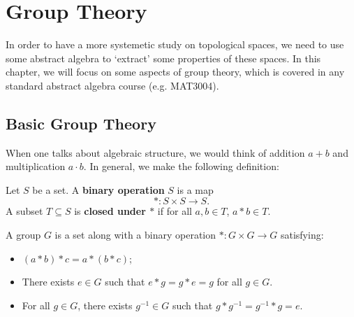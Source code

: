 

\chapter{Group Theory}
In order to have a more systemetic study on topological spaces, we need to use some abstract algebra to `extract' some properties of these spaces. In this chapter, we will focus on some aspects of group theory, which is covered in any standard abstract algebra course (e.g. MAT3004). 
\section{Basic Group Theory}
When one talks about algebraic structure, we would think of addition $a + b$ and multiplication $a \cdot b$. In general, we make the following definition:
\begin{definition}
    Let $S$ be a set. A {\bf binary operation} $S$ is a map
    $$\ast: S \times S \to S.$$
    A subset $T \subseteq S$ is {\bf closed under $\ast$} if for all $a, b \in T$, $a \ast b \in T$.
\end{definition}

\begin{definition} \label{def-group}
    A group $G$ is a set along with a binary operation $\ast: G \times G \to G$ satisfying:
    \begin{itemize}
        \item $(a \ast b) \ast c = a \ast (b \ast c)$;
        \item There exists $e\in G$ such that $e \ast g = g \ast e = g$ for all $g \in G$.
        \item For all $g \in G$, there exists $g^{-1} \in G$ such that $g \ast g^{-1} = g^{-1} \ast g = e$.
    \end{itemize}
\end{definition}

